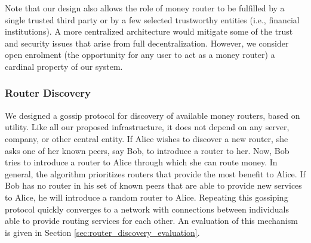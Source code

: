 Note that our design also allows the role of money router to be fulfilled by a single trusted third party or by a few selected trustworthy entities (i.e., financial institutions).
A more centralized architecture would mitigate some of the trust and security issues that arise from full decentralization.
However, we consider open enrolment (the opportunity for any user to act as a money router) a cardinal property of our system.

\subsubsection*{Router Discovery}
\label{sec:peer_discovery}
We designed a gossip protocol for discovery of available money routers, based on utility.
Like all our proposed infrastructure, it does not depend on any server, company, or other central entity.
If Alice wishes to discover a new router, she asks one of her known peers, say Bob, to introduce a router to her.
Now, Bob tries to introduce a router to Alice through which she can route money. %
In general, the algorithm prioritizes routers that provide the most benefit to Alice.
If Bob has no router in his set of known peers that are able to provide new services to Alice, he will introduce a random router to Alice.
Repeating this gossiping protocol quickly converges to a network with connections between individuals able to provide routing services for each other.
An evaluation of this mechanism is given in Section \ref{sec:router_discovery_evaluation}.


